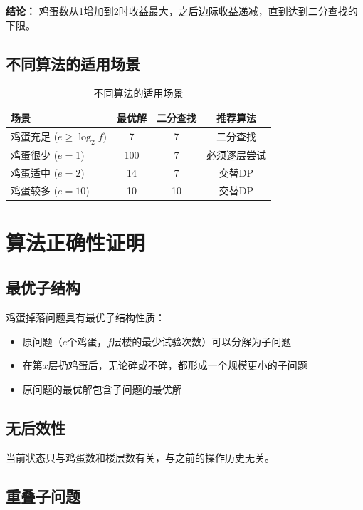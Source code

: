 \documentclass[12pt,a4paper]{article}
\begin{document}
\textbf{结论：} 鸡蛋数从1增加到2时收益最大，之后边际收益递减，直到达到二分查找的下限。

\subsection{不同算法的适用场景}

\begin{table}[H]
\centering
\caption{不同算法的适用场景}
\label{tab:scenarios}
\begin{tabular}{@{}lccc@{}}
\toprule
\textbf{场景} & \textbf{最优解} & \textbf{二分查找} & \textbf{推荐算法} \\
\midrule
鸡蛋充足 ($e \geq \log_2 f$) & 7 & 7 & 二分查找 \\
鸡蛋很少 ($e=1$) & 100 & 7 & 必须逐层尝试 \\
鸡蛋适中 ($e=2$) & 14 & 7 & 交替DP \\
鸡蛋较多 ($e=10$) & 10 & 10 & 交替DP \\
\bottomrule
\end{tabular}
\end{table}

\section{算法正确性证明}

\subsection{最优子结构}

鸡蛋掉落问题具有最优子结构性质：
\begin{itemize}
    \item 原问题（$e$个鸡蛋，$f$层楼的最少试验次数）可以分解为子问题
    \item 在第$x$层扔鸡蛋后，无论碎或不碎，都形成一个规模更小的子问题
    \item 原问题的最优解包含子问题的最优解
\end{itemize}

\subsection{无后效性}

当前状态只与鸡蛋数和楼层数有关，与之前的操作历史无关。

\subsection{重叠子问题}
\end{document}
